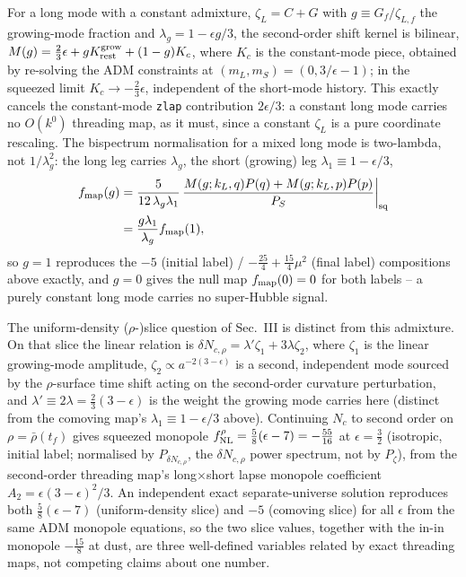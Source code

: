 \documentclass[aps,prd,twocolumn,superscriptaddress,showpacs,preprintnumbers,nofootinbib,longbibliography,floatfix]{revtex4-2}
\newcommand{\eps}{\epsilon}
\begin{document}
For a long mode with a constant admixture, $\zeta_L=C+G$ with $g\equiv G_f/\zeta_{L,f}$ the
growing-mode fraction and $\lambda_g=1-\eps g/3$, the second-order shift kernel is bilinear,
$M(g)=\tfrac23\eps+gK^{\rm grow}_{\rm rest}+(1-g)K_c$, where $K_c$ is the constant-mode
piece, obtained by re-solving the ADM constraints at $(m_L,m_S)=(0,3/\eps-1)$; in the
squeezed limit $K_c\to-\tfrac23\eps$, independent of the short-mode history. This exactly
cancels the constant-mode \texttt{zlap} contribution $2\eps/3$: a constant long mode carries
no $O(k^0)$ threading map, as it must, since a constant $\zeta_L$ is a pure coordinate
rescaling. The bispectrum normalisation for a mixed long mode is two-lambda, not
$1/\lambda_g^2$: the long leg carries $\lambda_g$, the short (growing) leg
$\lambda_1\equiv1-\eps/3$,
\begin{align}
f_{\rm map}(g)&=\frac{5}{12\,\lambda_g\lambda_1}\,
\frac{M(g;k_L,q)P(q)+M(g;k_L,p)P(p)}{P_S}\bigg|_{\rm sq}\nonumber\\
&=\frac{g\lambda_1}{\lambda_g}f_{\rm map}(1),
\end{align}
so $g=1$ reproduces the $-5$ (initial label) / $-\tfrac{25}{4}+\tfrac{15}{4}\mu^2$ (final
label) compositions above exactly, and $g=0$ gives the null map $f_{\rm map}(0)=0$ for both
labels -- a purely constant long mode carries no super-Hubble signal.

The uniform-density ($\rho$-)slice question of Sec.~III is distinct from this admixture. On
that slice the linear relation is $\delta N_{c,\rho}=\lambda'\zeta_1+3\lambda\zeta_2$, where
$\zeta_1$ is the linear growing-mode amplitude, $\zeta_2\propto a^{-2(3-\eps)}$ is a second,
independent mode sourced by the $\rho$-surface time shift acting on the second-order
curvature perturbation, and $\lambda'\equiv2\lambda=\tfrac23(3-\eps)$ is the weight the
growing mode carries here (distinct from the comoving map's $\lambda_1\equiv1-\eps/3$ above).
Continuing $N_c$ to second order on $\rho=\bar\rho(t_f)$ gives squeezed monopole
$f^{\rho}_{\rm NL}=\tfrac58(\eps-7)=-\tfrac{55}{16}$ at $\eps=\tfrac32$ (isotropic, initial
label; normalised by $P_{\delta N_{c,\rho}}$, the $\delta N_{c,\rho}$ power spectrum, not by
$P_\zeta$), from the second-order threading map's long$\times$short lapse monopole
coefficient $A_2=\eps(3-\eps)^2/3$. An independent exact separate-universe solution
reproduces both $\tfrac58(\eps-7)$ (uniform-density slice) and $-5$ (comoving slice) for all
$\eps$ from the same ADM monopole equations, so the two slice values, together with the
in-in monopole $-\tfrac{15}{8}$ at dust, are three well-defined variables related by exact
threading maps, not competing claims about one number.
\end{document}
